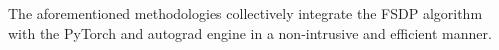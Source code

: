 The aforementioned methodologies collectively integrate the FSDP algorithm with the PyTorch  and autograd engine in a non-intrusive and efficient manner.





 
